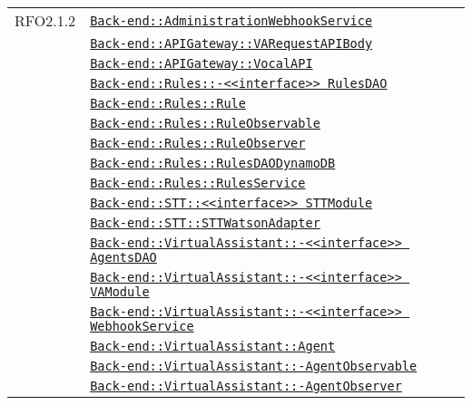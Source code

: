 \begin{longtable}{|>{\centering}m{3cm}|m{10cm}<{\centering}|}
RFO2.1.2 & \hyperref[Back-end::AdministrationWebhookService]{\texttt{Back-end::AdministrationWebhookService}}\\
& \hyperref[Back-end::APIGateway::VARequestAPIBody]{\texttt{Back-end::APIGateway::VARequestAPIBody}}\\
& \hyperref[Back-end::APIGateway::VocalAPI]{\texttt{Back-end::APIGateway::VocalAPI}}\\
& \hyperref[Back-end::Rules::<<interface>> RulesDAO]{\texttt{Back-end::Rules::-\linebreak <<interface>> RulesDAO}}\\
& \hyperref[Back-end::Rules::Rule]{\texttt{Back-end::Rules::Rule}}\\
& \hyperref[Back-end::Rules::RuleObservable]{\texttt{Back-end::Rules::RuleObservable}}\\
& \hyperref[Back-end::Rules::RuleObserver]{\texttt{Back-end::Rules::RuleObserver}}\\
& \hyperref[Back-end::Rules::RulesDAODynamoDB]{\texttt{Back-end::Rules::RulesDAODynamoDB}}\\
& \hyperref[Back-end::Rules::RulesService]{\texttt{Back-end::Rules::RulesService}}\\
& \hyperref[Back-end::STT::<<interface>> STTModule]{\texttt{Back-end::STT::<<interface>> STTModule}}\\
& \hyperref[Back-end::STT::STTWatsonAdapter]{\texttt{Back-end::STT::STTWatsonAdapter}}\\
& \hyperref[Back-end::VirtualAssistant::<<interface>> AgentsDAO]{\texttt{Back-end::VirtualAssistant::-\linebreak <<interface>> AgentsDAO}}\\
& \hyperref[Back-end::VirtualAssistant::<<interface>> VAModule]{\texttt{Back-end::VirtualAssistant::-\linebreak <<interface>> VAModule}}\\
& \hyperref[Back-end::VirtualAssistant::<<interface>> WebhookService]{\texttt{Back-end::VirtualAssistant::-\linebreak <<interface>> WebhookService}}\\
& \hyperref[Back-end::VirtualAssistant::Agent]{\texttt{Back-end::VirtualAssistant::Agent}}\\
& \hyperref[Back-end::VirtualAssistant::AgentObservable]{\texttt{Back-end::VirtualAssistant::-\linebreak AgentObservable}}\\
& \hyperref[Back-end::VirtualAssistant::AgentObserver]{\texttt{Back-end::VirtualAssistant::-\linebreak AgentObserver}}\\

\end{longtable}
